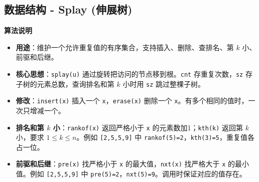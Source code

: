 \documentclass[10pt,landscape,a4paper]{article}
\begin{document}
\begin{multicols*}{3}
\subsection*{数据结构 - Splay (伸展树)}
\par\addvspace{0.7ex}\noindent\textbf{算法说明}\par\nobreak
\begin{itemize}
\item \textbf{用途}：维护一个允许重复值的有序集合，支持插入、删除、查排名、第 $k$ 小、前驱和后继。
\item \textbf{核心思想}：\texttt{s\allowbreak{}p\allowbreak{}l\allowbreak{}a\allowbreak{}y\allowbreak{}(\allowbreak{}u\allowbreak{})} 通过旋转把访问的节点移到根。\texttt{c\allowbreak{}n\allowbreak{}t} 存重复次数，\texttt{s\allowbreak{}z} 存子树的元素总数，查询排名和第 $k$ 小时用 \texttt{s\allowbreak{}z} 跳过整棵子树。
\item \textbf{修改}：\texttt{i\allowbreak{}n\allowbreak{}s\allowbreak{}e\allowbreak{}r\allowbreak{}t\allowbreak{}(\allowbreak{}x\allowbreak{})} 插入一个 \texttt{x}，\texttt{e\allowbreak{}r\allowbreak{}a\allowbreak{}s\allowbreak{}e\allowbreak{}(\allowbreak{}x\allowbreak{})} 删除一个 \texttt{x}。有多个相同的值时，一次只增减一个。
\item \textbf{排名和第 $k$ 小}：\texttt{r\allowbreak{}a\allowbreak{}n\allowbreak{}k\allowbreak{}o\allowbreak{}f\allowbreak{}(\allowbreak{}x\allowbreak{})} 返回严格小于 \texttt{x} 的元素数加1；\texttt{k\allowbreak{}t\allowbreak{}h\allowbreak{}(\allowbreak{}k\allowbreak{})} 返回第 $k$ 小，要求 $1\le k\le n$。例如 \texttt{[\allowbreak{}2\allowbreak{},\allowbreak{}5\allowbreak{},\allowbreak{}5\allowbreak{},\allowbreak{}9\allowbreak{}]} 中 \texttt{r\allowbreak{}a\allowbreak{}n\allowbreak{}k\allowbreak{}o\allowbreak{}f\allowbreak{}(\allowbreak{}5\allowbreak{})\allowbreak{}=\allowbreak{}2}，\texttt{k\allowbreak{}t\allowbreak{}h\allowbreak{}(\allowbreak{}3\allowbreak{})\allowbreak{}=\allowbreak{}5}，重复值各占一位。
\item \textbf{前驱和后继}：\texttt{p\allowbreak{}r\allowbreak{}e\allowbreak{}(\allowbreak{}x\allowbreak{})} 找严格小于 \texttt{x} 的最大值，\texttt{n\allowbreak{}x\allowbreak{}t\allowbreak{}(\allowbreak{}x\allowbreak{})} 找严格大于 \texttt{x} 的最小值。例如 \texttt{[\allowbreak{}2\allowbreak{},\allowbreak{}5\allowbreak{},\allowbreak{}5\allowbreak{},\allowbreak{}9\allowbreak{}]} 中 \texttt{p\allowbreak{}r\allowbreak{}e\allowbreak{}(\allowbreak{}5\allowbreak{})\allowbreak{}=\allowbreak{}2}，\texttt{n\allowbreak{}x\allowbreak{}t\allowbreak{}(\allowbreak{}5\allowbreak{})\allowbreak{}=\allowbreak{}9}。调用时保证对应的值存在。

\end{itemize}
\end{multicols*}
\end{document}
